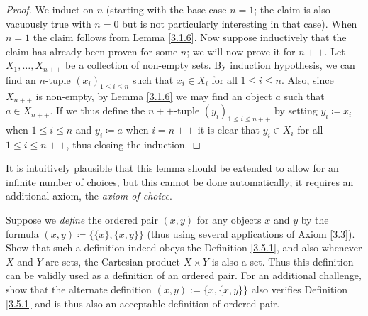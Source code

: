 \begin{proof}
    We induct on \(n\) (starting with the base case \(n = 1\); the claim is also vacuously true with \(n = 0\) but is not particularly interesting in that case).
    When \(n = 1\) the claim follows from Lemma \ref{3.1.6}.
    Now suppose inductively that the claim has already been proven for some \(n\);
    we will now prove it for \(n++\).
    Let \(X_1, \dots, X_{n++}\) be a collection of non-empty sets.
    By induction hypothesis, we can find an \(n\)-tuple \((x_i)_{1 \leq i \leq n}\) such that \(x_i \in X_i\) for all \(1 \leq i \leq n\).
    Also, since \(X_{n++}\) is non-empty, by Lemma \ref{3.1.6} we may find an object \(a\) such that \(a \in X_{n++}\).
    If we thus define the \(n++\)-tuple \((y_i)_{1 \leq i \leq n++}\) by setting \(y_i \coloneqq x_i\) when \(1 \leq i \leq n\) and \(y_i \coloneqq a\) when \(i = n++\) it is clear that \(y_i \in X_i\) for all \(1 \leq i \leq n++\), thus closing the induction.
\end{proof}

\begin{remark}\label{3.5.13}
    It is intuitively plausible that this lemma should be extended to allow for an infinite number of choices, but this cannot be done automatically;
    it requires an additional axiom, the \emph{axiom of choice}.
\end{remark}

\exercisesection

\begin{exercise}\label{ex 3.5.1}
    Suppose we \emph{define} the ordered pair \((x, y)\) for any objects \(x\) and \(y\) by the formula \((x, y) \coloneqq \{\{x\}, \{x, y\}\}\)
    (thus using several applications of Axiom \ref{3.3}).
    Show that such a definition indeed obeys the Definition \ref{3.5.1}, and also whenever \(X\) and \(Y\) are sets, the Cartesian product \(X \times Y\) is also a set.
    Thus this definition can be validly used as a definition of an ordered pair.
    For an additional challenge, show that the alternate definition \((x, y) := \{x, \{x, y\}\}\) also verifies Definition \ref{3.5.1} and is thus also an acceptable definition of ordered pair.
\end{exercise}

